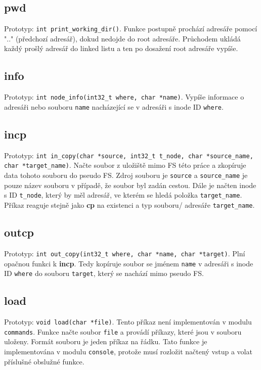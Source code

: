 \documentclass[12pt]{report}
\begin{document}
\subsection{pwd}
Prototyp: \texttt{int print\_working\_dir()}. Funkce postupně prochází adresáře pomocí ".." (předchozí adresář),
dokud nedojde do root adresáře. Průchodem ukládá každý prošlý adresář do linked listu a ten po dosažení root
adresáře vypíše.
\subsection{info}
Prototyp: \texttt{int node\_info(int32\_t where, char *name)}. Vypíše informace o adresáři nebo souboru 
\texttt{name} nacházející se v adresáři s inode ID \texttt{where}.
\subsection{incp}
Prototyp: \texttt{int in\_copy(char *source, int32\_t t\_node, char *source\_name, char *target\_name)}.
Načte soubor z uložiště mimo FS této práce a zkopíruje data tohoto souboru do pseudo FS. Zdroj souboru
je \texttt{source} a \texttt{source\_name} je pouze název souboru v případě, že soubor byl zadán cestou.
Dále je načten inode s ID \texttt{t\_node}, který by měl adresář, ve kterém se hledá položka
\texttt{target\_name}. Příkaz reaguje stejně jako \textbf{cp} na existenci a typ souboru/ adresáře
\texttt{target\_name}.
\subsection{outcp}
Prototyp: \texttt{int out\_copy(int32\_t where, char *name, char *target)}. Plní opačnou funkci k \textbf{incp}.
Tedy kopíruje soubor se jménem \texttt{name} v adresáři s inode ID \texttt{where} do souboru \texttt{target}, 
který se nachází mimo pseudo FS.
\subsection{load}
Prototyp: \texttt{void load(char *file)}. Tento příkaz není implementován v modulu
\texttt{commands}. Funkce načte soubor \texttt{file} a provádí příkazy, které jsou v souboru uloženy.
Formát souboru je jeden příkaz na řádku. Tato funkce je implementována v modulu \texttt{console}, protože
musí rozložit načtený vstup a volat příslušné obslužné funkce.
\end{document}
